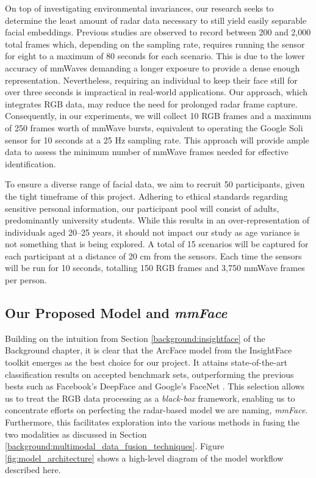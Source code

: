 \documentclass{interim}
\begin{document}
On top of investigating environmental invariances, our research seeks to determine the least amount of radar data necessary to still yield easily separable facial embeddings. Previous studies are observed to record between 200 and 2,000 total frames which, depending on the sampling rate, requires running the sensor for eight to a maximum of 80 seconds for each scenario. This is due to the lower accuracy of mmWaves demanding a longer exposure to provide a dense enough representation. Nevertheless, requiring an individual to keep their face still for over three seconds is impractical in real-world applications. Our approach, which integrates RGB data, may reduce the need for prolonged radar frame capture. Consequently, in our experiments, we will collect 10 RGB frames and a maximum of 250 frames worth of mmWave bursts, equivalent to operating the Google Soli sensor for 10 seconds at a 25 Hz sampling rate. This approach will provide ample data to assess the minimum number of mmWave frames needed for effective identification. 

To ensure a diverse range of facial data, we aim to recruit 50 participants, given the tight timeframe of this project. Adhering to ethical standards regarding sensitive personal information, our participant pool will consist of adults, predominantly university students. While this results in an over-representation of individuals aged 20--25 years, it should not impact our study as age variance is not something that is being explored. A total of 15 scenarios will be captured for each participant at a distance of 20 cm from the sensors. Each time the sensors will be run for 10 seconds, totalling 150 RGB frames and 3,750 mmWave frames per person.


\subsection{Our Proposed Model and \textit{mmFace}}
Building on the intuition from Section \ref{background:insightface} of the Background chapter, it is clear that the ArcFace model from the InsightFace toolkit emerges as the best choice for our project. It attains state-of-the-art classification results on accepted benchmark sets, outperforming the previous bests such as Facebook's DeepFace \cite{taigman2014deepface} and Google's FaceNet \cite{schroff2015facenet}. This selection allows us to treat the RGB data processing as a \textit{black-box} framework, enabling us to concentrate efforts on perfecting the radar-based model we are naming, \textit{mmFace}. Furthermore, this facilitates exploration into the various methods in fusing the two modalities as discussed in Section \ref{background:multimodal_data_fusion_techniques}. Figure \ref{fig:model_architecture} shows a high-level diagram of the model workflow described here. 
\end{document}
